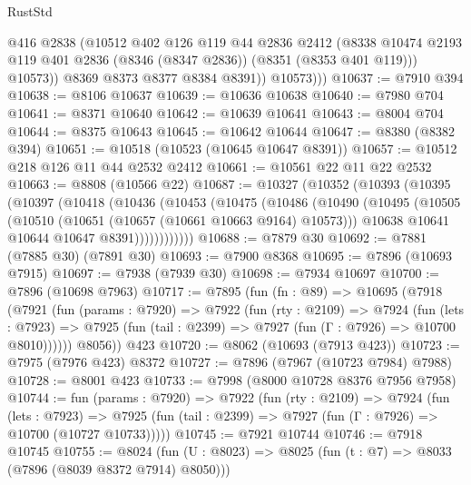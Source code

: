 \begin{lexlean}{RustStd}
\begin{coremodule}
{\begin{coremodule}
{{{{{{{{{{{{{{{{{{{{{{{{{{{{{{{{{{{{{{{{{{{{{{{{{{                @416
                @2838
                (@10512
                  @402
                  @126
                  @119
                  @44
                  @2836
                  @2412
                  (@8338
                    @10474
                    @2193
                    @119
                    @401
                    @2836
                    (@8346 (@8347 @2836))
                    (@8351 (@8353 @401 @119)))
                  @10573))
              @8369
              @8373
              @8377
              @8384
              @8391))
          @10573)))
@10637 := @7910 @394
@10638 := @8106 @10637
@10639 := @10636 @10638
@10640 := @7980 @704
@10641 := @8371 @10640
@10642 := @10639 @10641
@10643 := @8004 @704
@10644 := @8375 @10643
@10645 := @10642 @10644
@10647 := @8380 (@8382 @394)
@10651 := @10518 (@10523 (@10645 @10647 @8391))
@10657 := @10512 @218 @126 @11 @44 @2532 @2412
@10661 := @10561 @22 @11 @22 @2532
@10663 := @8808 (@10566 @22)
@10687 := @10327
    (@10352
      (@10393
        (@10395
          (@10397
            (@10418
              (@10436
                (@10453
                  (@10475
                    (@10486
                      (@10490
                        (@10495
                          (@10505
                            (@10510 (@10651 (@10657 (@10661 @10663 @9164) @10573)))
                            @10638
                            @10641
                            @10644
                            @10647
                            @8391))))))))))))
@10688 := @7879 @30
@10692 := @7881 (@7885 @30) (@7891 @30)
@10693 := @7900 @8368
@10695 := @7896 (@10693 @7915)
@10697 := @7938 (@7939 @30)
@10698 := @7934 @10697
@10700 := @7896 (@10698 @7963)
@10717 := @7895
    (fun (fn : @89) =>
    @10695
      (@7918
        (@7921
          (fun (params : @7920) =>
          @7922
            (fun (rty : @2109) =>
            @7924
              (fun (lets : @7923) =>
              @7925 (fun (tail : @2399) => @7927 (fun (Γ : @7926) => @10700 @8010))))))
        @8056))
    @423
@10720 := @8062 (@10693 (@7913 @423))
@10723 := @7975 (@7976 @423) @8372
@10727 := @7896 (@7967 (@10723 @7984) @7988)
@10728 := @8001 @423
@10733 := @7998 (@8000 @10728 @8376 @7956 @7958)
@10744 := fun (params : @7920) =>
  @7922
    (fun (rty : @2109) =>
    @7924
      (fun (lets : @7923) =>
      @7925 (fun (tail : @2399) => @7927 (fun (Γ : @7926) => @10700 (@10727 @10733)))))
@10745 := @7921 @10744
@10746 := @7918 @10745
@10755 := @8024 (fun (U : @8023) => @8025 (fun (t : @7) => @8033 (@7896 (@8039 @8372 @7914) @8050)))
}}}}}}}}}}}}}}}}}}}}}}}}}}}}}}}}}}}}}}}}}}}}}}}}}}
\end{coremodule}}
\end{coremodule}
\end{lexlean}

